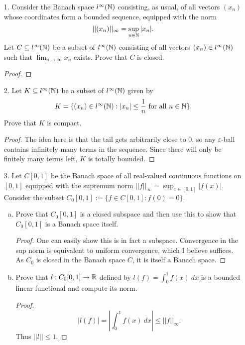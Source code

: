 

\begin{itemize}
\item[1.] Consider the Banach space $l^{\infty}(\mathbb{N})$ consisting, as usual, of all vectors $(x_n)$ whose coordinates form a bounded sequence, equipped with the norm
$$||(x_n)||_{\infty} = \sup_{n \in \mathbb{N}}|x_n|.$$
Let $C \subseteq l^{\infty}(\mathbb{N})$ be a subset of $l^{\infty}(\mathbb{N})$ consisting of all vectors $(x_n) \in l^{\infty}(\mathbb{N})$ such that $\lim_{n \rightarrow \infty} x_n$ exists. Prove that $C$ is closed.

\begin{proof}

\end{proof}





\item[2.] \label{q:w21-2} Let $K \subseteq l^{\infty}(\mathbb{N})$ be a subset of $l^{\infty}(\mathbb{N})$ given by 
$$K = \{(x_n) \in l^{\infty}(\mathbb{N}) : |x_n| \leq \frac{1}{n} \text{ for all } n \in \mathbb{N}\}.$$
Prove that $K$ is compact.
\begin{proof}
The idea here is that the tail gets arbitrarily close to $0$, so any $\varepsilon$-ball contains infinitely many terms in the sequence. Since there will only be finitely many terms left, $K$ is totally bounded.
\end{proof}



\item[3.] Let $C[0, 1]$ be the Banach space of all real-valued continuous functions on
$[0, 1]$ equipped with the supremum norm $||f||_{\infty} = \sup_{x \in [0,1]}|f(x)|$. Consider the subset
$C_0[0, 1] := \{f \in C[0, 1] : f(0) = 0\}$.
\begin{enumerate}[(a)]
\item Prove that $C_0[0, 1]$ is a closed subspace and then use this to show that $C_0[0, 1]$ is a Banach space itself.
\begin{proof}
One can easily show this is in fact a subspace. Convergence in the sup norm is equivalent to uniform convergence, which I believe suffices. As $C_0$ is closed in the Banach space $C$, it is itself a Banach space.
\end{proof}

\item Prove that $l : C_0[0, 1] \rightarrow \mathbb{R}$ defined by $l(f) = \int_{0}^1 f(x) \ dx$ is a bounded linear functional and compute its norm.
\begin{proof}
$$|l(f)| = |\int_{0}^1 f(x) \ dx| \leq ||f||_{\infty}.$$
Thus $||l|| \leq 1$. 


\end{proof}
\end{enumerate}
\end{itemize}
